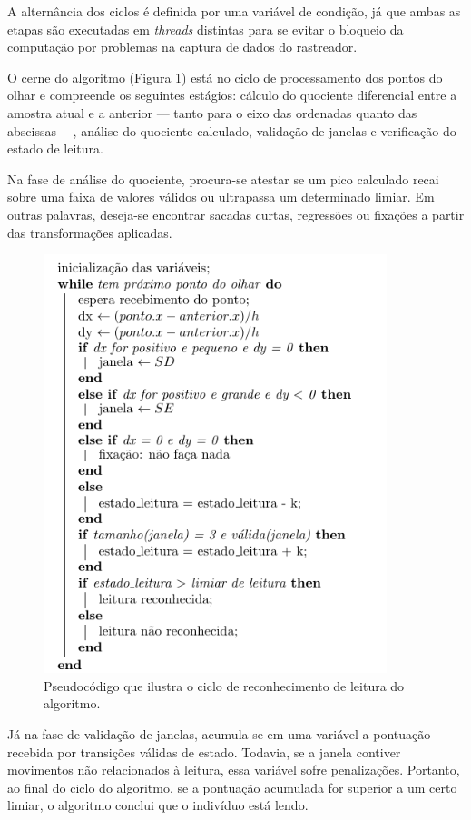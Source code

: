 \documentclass[12pt]{article}
\begin{document}
		A alternância dos ciclos é definida por uma variável de condição, já que ambas as etapas são executadas em \textit{threads} distintas para se evitar o bloqueio da computação por problemas na captura de dados do rastreador.
		
		O cerne do algoritmo (Figura \ref{fig:algoritmo}) está no ciclo de processamento dos pontos do olhar e compreende os seguintes estágios: cálculo do quociente diferencial entre a amostra atual e a anterior --- tanto para o eixo das ordenadas quanto das abscissas ---, análise do quociente calculado, validação de janelas e verificação do estado de leitura.
		
		Na fase de análise do quociente, procura-se atestar se um pico calculado recai sobre uma faixa de valores válidos ou ultrapassa um determinado limiar. Em outras palavras, deseja-se encontrar sacadas curtas, regressões ou fixações a partir das transformações aplicadas.
		
		\begin{figure}[!ht]
			\centering
			\includegraphics[width=10cm]{imgs/algoritmo.png}
			\caption{\footnotesize {Pseudocódigo que ilustra o ciclo de reconhecimento de leitura do algoritmo.}}
			\label{fig:algoritmo}
			\vspace{5mm}
		\end{figure}
		
		Já na fase de validação de janelas, acumula-se em uma variável a pontuação recebida por transições válidas de estado. Todavia, se a janela contiver movimentos não relacionados à leitura, essa variável sofre penalizações. Portanto, ao final do ciclo do algoritmo, se a pontuação acumulada for superior a um certo limiar, o algoritmo conclui que o indivíduo está lendo. 
		
\end{document}
